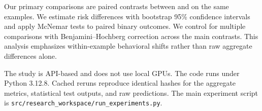  Our primary comparisons are paired contrasts between \forcedanswer and \abstainallowed on the same examples. We estimate risk differences with bootstrap 95\% confidence intervals and apply McNemar tests to paired binary outcomes. We control for multiple comparisons with Benjamini--Hochberg correction across the main contrasts. This analysis emphasizes within-example behavioral shifts rather than raw aggregate differences alone.

 The study is API-based and does not use local GPUs. The code runs under Python 3.12.8. Cached reruns reproduce identical hashes for the aggregate metrics, statistical test outputs, and raw predictions. The main experiment script is \texttt{src/research\_workspace/run\_experiments.py}.
